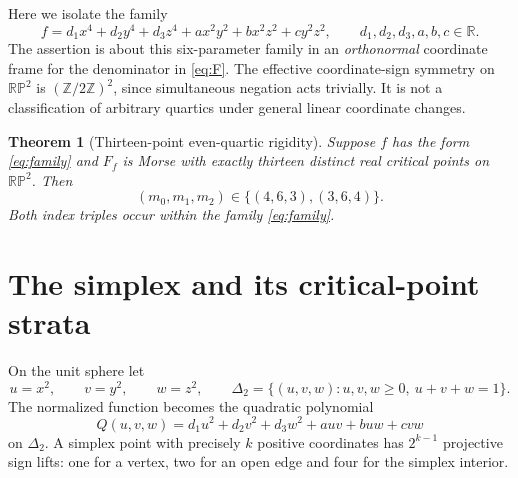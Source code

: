 \documentclass[10pt,a4paper]{article}
\theoremstyle{plain}
\newtheorem{theorem}{Theorem}
\theoremstyle{remark}
\newcommand{\RP}{\mathbb{RP}}
\begin{document}
Here we isolate the family
\begin{equation}\label{eq:family}
 f=d_1x^4+d_2y^4+d_3z^4+ax^2y^2+bx^2z^2+cy^2z^2,
 \qquad d_1,d_2,d_3,a,b,c\in\mathbb R.
\end{equation}
The assertion is about this six-parameter family in an \emph{orthonormal} coordinate frame for the denominator in \eqref{eq:F}. The effective coordinate-sign symmetry on $\RP^2$ is $(\mathbb Z/2\mathbb Z)^2$, since simultaneous negation acts trivially. It is not a classification of arbitrary quartics under general linear coordinate changes.

\begin{theorem}[Thirteen-point even-quartic rigidity]\label{thm:main}
Suppose $f$ has the form \eqref{eq:family} and $F_f$ is Morse with exactly thirteen distinct real critical points on $\RP^2$. Then
\begin{equation}\label{eq:claim}
 (m_0,m_1,m_2)\in\{(4,6,3),(3,6,4)\}.
\end{equation}
Both index triples occur within the family \eqref{eq:family}.
\end{theorem}

\section{The simplex and its critical-point strata}
On the unit sphere let
\[
 u=x^2,\qquad v=y^2,\qquad w=z^2,\qquad
 \Delta_2=\{(u,v,w):u,v,w\ge0,\ u+v+w=1\}.
\]
The normalized function becomes the quadratic polynomial
\begin{equation}\label{eq:Q}
 Q(u,v,w)=d_1u^2+d_2v^2+d_3w^2+auv+buw+cvw
\end{equation}
on $\Delta_2$. A simplex point with precisely $k$ positive coordinates has $2^{k-1}$ projective sign lifts: one for a vertex, two for an open edge and four for the simplex interior.
\end{document}
